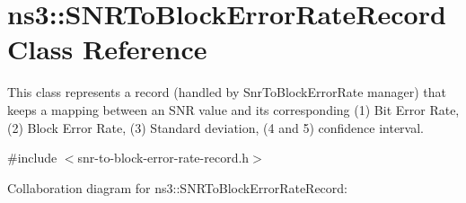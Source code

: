 \hypertarget{classns3_1_1SNRToBlockErrorRateRecord}{}\section{ns3\+:\+:S\+N\+R\+To\+Block\+Error\+Rate\+Record Class Reference}
\label{classns3_1_1SNRToBlockErrorRateRecord}


This class represents a record (handled by Snr\+To\+Block\+Error\+Rate manager) that keeps a mapping between an S\+NR value and its corresponding (1) Bit Error Rate, (2) Block Error Rate, (3) Standard deviation, (4 and 5) confidence interval.  




{\ttfamily \#include $<$snr-\/to-\/block-\/error-\/rate-\/record.\+h$>$}



Collaboration diagram for ns3\+:\+:S\+N\+R\+To\+Block\+Error\+Rate\+Record\+:
